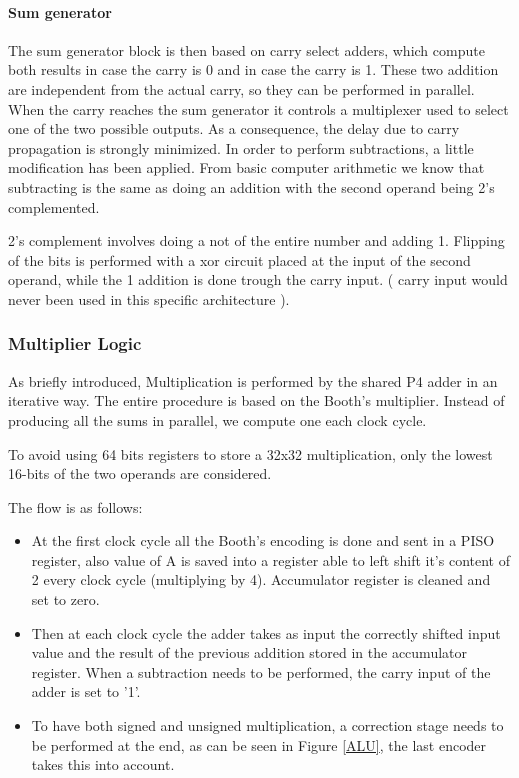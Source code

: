\documentclass[12pt]{article}
\begin{document}
\paragraph{Sum generator}The sum generator block is then based on carry select adders, which compute both results in case the carry is 0 and in case the carry is 1. These two addition are independent from the actual carry, so they can be performed in parallel. When the carry reaches the sum generator it controls a multiplexer used to select one of the two possible outputs.
As a consequence, the delay due to carry propagation is strongly minimized.
\newline
\newline
In order to perform subtractions, a little modification has been applied. From basic computer arithmetic we know that subtracting is the same as doing an addition with the second operand being 2's complemented.

2's complement involves doing a not of the entire number and adding 1.
Flipping of the bits is performed with a xor circuit placed at the input of the second operand, while the 1 addition is done trough the carry input. ( carry input would never been used in this specific architecture ). 



\subsubsection{Multiplier Logic}
As briefly introduced, Multiplication is performed by the shared P4 adder in an iterative way.
The entire procedure is based on the Booth's multiplier. Instead of producing all the sums in parallel, we compute one each clock cycle.

To avoid using 64 bits registers to store a 32x32 multiplication, only the lowest 16-bits of the two operands are considered.

The flow is as follows:
\begin{itemize}
	\item At the first clock cycle all the Booth's encoding is done and sent in a PISO register, also value of A is saved into a register able to left shift it's content of 2 every clock cycle (multiplying by 4). Accumulator register is cleaned and set to zero.
	\item Then at each clock cycle the adder takes as input the correctly shifted input value and the result of the previous addition stored in the accumulator register. When a subtraction needs to be performed, the carry input of the adder is set to '1'.
	\item To have both signed and unsigned multiplication, a correction stage needs to be performed at the end, as can be seen in Figure \ref{ALU}, the last encoder takes this into account.
	
\end{itemize}
\end{document}
